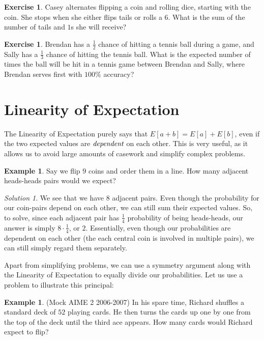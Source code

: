 \documentclass[letterpaper]{article}
\theoremstyle{definition}
\newtheorem{example}[thm]{Example}
\theoremstyle{remark}
\newtheorem*{solution}{Solution}
\theoremstyle{definition}
\newtheorem{exercise}[thm]{Exercise}
\begin{document}
\begin{exercise}
    Casey alternates flipping a coin and rolling dice, starting with the coin. She stops when she either flips tails or rolls a $6$. What is the sum of the number of tails and $1$s she will receive?
\end{exercise}

\begin{exercise}
    Brendan has a $\frac{1}{2}$ chance of hitting a tennis ball during a game, and Sally has a $\frac{1}{3}$ chance of hitting the tennis ball. What is the expected number of times the ball will be hit in a tennis game between Brendan and Sally, where Brendan serves first with $100\%$ accuracy?
\end{exercise}

\section{Linearity of Expectation}
The Linearity of Expectation purely says that $E[a+b] = E[a] + E[b]$, even if the two expected values are $\emph{dependent}$ on each other. This is very useful, as it allows us to avoid large amounts of casework and simplify complex problems.

\begin{example}
Say we flip $9$ coins and order them in a line. How many adjacent heads-heads pairs would we expect?
\end{example}

\begin{solution}
We see that we have $8$ adjacent pairs. Even though the probability for our coin-pairs depend on each other, we can still sum their expected values. So, to solve, since each adjacent pair has $\frac{1}{4}$ probability of being heads-heads, our answer is simply $8\cdot\frac{1}{4}$, or $2$. Essentially, even though our probabilities are dependent on each other (the each central coin is involved in multiple pairs), we can still simply regard them separately.\\
\end{solution}

\noindent
Apart from simplifying problems, we can use a symmetry argument along with the Linearity of Expectation to equally divide our probabilities. Let us use a problem to illustrate this principal:

\begin{example}
(Mock AIME 2 2006-2007) In his spare time, Richard shuffles a standard deck of $52$ playing cards. He then turns the cards up one by one from the top of the deck until the third ace appears. How many cards would Richard expect to flip?
\end{example}
\end{document}
